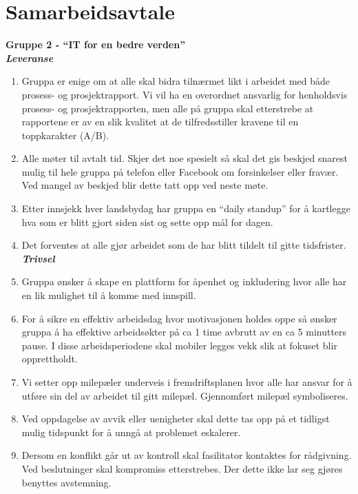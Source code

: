 \section{Samarbeidsavtale}
\label{appendix:samarbeidsavtale}
{\bf Gruppe 2 - ``IT for en bedre verden''}\\

{\bf \textit{Leveranse}}
\begin{enumerate}
\item Gruppa er enige om at alle skal bidra tilnærmet likt i arbeidet med både prosess- og prosjektrapport. Vi vil ha en overordnet ansvarlig for henholdsvis prosess- og prosjektrapporten, men alle på gruppa skal etterstrebe at rapportene er av en slik kvalitet at de tilfredsstiller kravene til en toppkarakter (A/B).
\item Alle møter til avtalt tid. Skjer det noe spesielt så skal det gis beskjed snarest mulig til hele gruppa på telefon eller Facebook om forsinkelser eller fravær. Ved mangel av beskjed blir dette tatt opp ved neste møte.
\item Etter innsjekk hver landsbydag har gruppa en “daily standup” for å kartlegge hva som er blitt gjort siden sist og sette opp mål for dagen.
\item Det forventes at alle gjør arbeidet som de har blitt tildelt til gitte tidsfrister.\\


{\bf \textit{Trivsel}}

\item Gruppa ønsker å skape en plattform for åpenhet og inkludering hvor alle har en lik mulighet til å komme med innspill.
\item For å sikre en effektiv arbeidsdag hvor motivasjonen holdes oppe så ønsker gruppa å ha effektive arbeidsøkter på ca 1 time avbrutt av en ca 5 minutters pause. I disse arbeidsperiodene skal mobiler legges vekk slik at fokuset blir opprettholdt.
\item Vi setter opp milepæler underveis i fremdriftsplanen hvor alle har ansvar for å utføre sin del av arbeidet til gitt milepæl. Gjennomført milepæl symboliseres.
\item Ved oppdagelse av avvik eller uenigheter skal dette tas opp på et tidligst mulig tidspunkt for å unngå at problemet eskalerer.
\item Dersom en konflikt går ut av kontroll skal fasilitator kontaktes for rådgivning.
Ved beslutninger skal kompromiss etterstrebes. Der dette ikke lar seg gjøres benyttes avstemning.\\


\end{enumerate}
